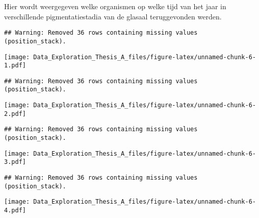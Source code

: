 \documentclass[]{article}
\newenvironment{Shaded}{\begin{snugshade}}{\end{snugshade}}
\newcommand{\KeywordTok}[1]{\textcolor[rgb]{0.13,0.29,0.53}{\textbf{#1}}}
\newcommand{\DataTypeTok}[1]{\textcolor[rgb]{0.13,0.29,0.53}{#1}}
\newcommand{\DecValTok}[1]{\textcolor[rgb]{0.00,0.00,0.81}{#1}}
\newcommand{\StringTok}[1]{\textcolor[rgb]{0.31,0.60,0.02}{#1}}
\newcommand{\ControlFlowTok}[1]{\textcolor[rgb]{0.13,0.29,0.53}{\textbf{#1}}}
\newcommand{\OperatorTok}[1]{\textcolor[rgb]{0.81,0.36,0.00}{\textbf{#1}}}
\newcommand{\NormalTok}[1]{#1}
\begin{document}
Hier wordt weergegeven welke organismen op welke tijd van het jaar in
verschillende pigmentatiestadia van de glasaal teruggevonden werden.

\begin{Shaded}
\end{Shaded}

\begin{verbatim}
## Warning: Removed 36 rows containing missing values (position_stack).
\end{verbatim}

\texttt{[image: Data\_Exploration\_Thesis\_A\_files/figure-latex/unnamed-chunk-6-1.pdf]}

\begin{verbatim}
## Warning: Removed 36 rows containing missing values (position_stack).
\end{verbatim}

\texttt{[image: Data\_Exploration\_Thesis\_A\_files/figure-latex/unnamed-chunk-6-2.pdf]}

\begin{verbatim}
## Warning: Removed 36 rows containing missing values (position_stack).
\end{verbatim}

\texttt{[image: Data\_Exploration\_Thesis\_A\_files/figure-latex/unnamed-chunk-6-3.pdf]}

\begin{verbatim}
## Warning: Removed 36 rows containing missing values (position_stack).
\end{verbatim}

\texttt{[image: Data\_Exploration\_Thesis\_A\_files/figure-latex/unnamed-chunk-6-4.pdf]}
\end{document}
